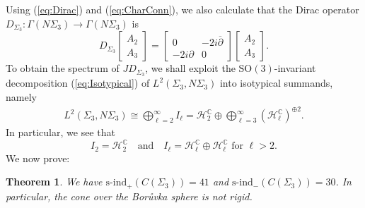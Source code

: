 \documentclass[11pt]{article}
\newcommand{\SO}{\mathrm{SO}}
\newcommand{\C}{\mathbb{C}}
\newcommand{\Hc}{\mathcal{H}}
\newtheorem{thm}{Theorem}[section]
\theoremstyle{definition}
\numberwithin{equation}{section}
\begin{document}
Using (\ref{eq:Dirac}) and (\ref{eq:CharConn}), we also calculate that the Dirac operator $D_{\Sigma_3} \colon \Gamma(N\Sigma_3) \to \Gamma(N\Sigma_3)$ is
\begin{equation*}
    D_{\Sigma_3} \!\begin{bmatrix}
        A_2 \\
        A_3
    \end{bmatrix} = \begin{bmatrix}
        0 & -2i \overline{\partial} \\
        -2i \partial & 0
    \end{bmatrix} \begin{bmatrix}
        A_2 \\ A_3
    \end{bmatrix}\!.
\end{equation*}
To obtain the spectrum of $JD_{\Sigma_3}$, we shall exploit the $\SO(3)$-invariant decomposition (\ref{eq:Isotypical}) of $L^2(\Sigma_3, N\Sigma_3)$ into isotypical summands, namely
\begin{align*}
L^2(\Sigma_3, N\Sigma_3) \cong \bigoplus_{\ell = 2}^\infty I_\ell = \Hc_2^\C \oplus \bigoplus_{\ell = 3}^\infty (\Hc_\ell^\C)^{\oplus 2}.
\end{align*}
In particular, we see that
$$I_2 = \Hc_2^\C \ \ \ \text{ and } \ \ \ I_\ell = \Hc_\ell^\C \oplus \Hc_\ell^\C \text{ for }\ell > 2.$$
We now prove:

\begin{thm} We have $\mathrm{s}\text{-}\mathrm{ind}_+(C(\Sigma_3)) = 41$ and $\mathrm{s}\text{-}\mathrm{ind}_-(C(\Sigma_3)) = 30$.  In particular, the cone over the Bor{\r{u}}vka sphere is not rigid.
\end{thm}
\end{document}
